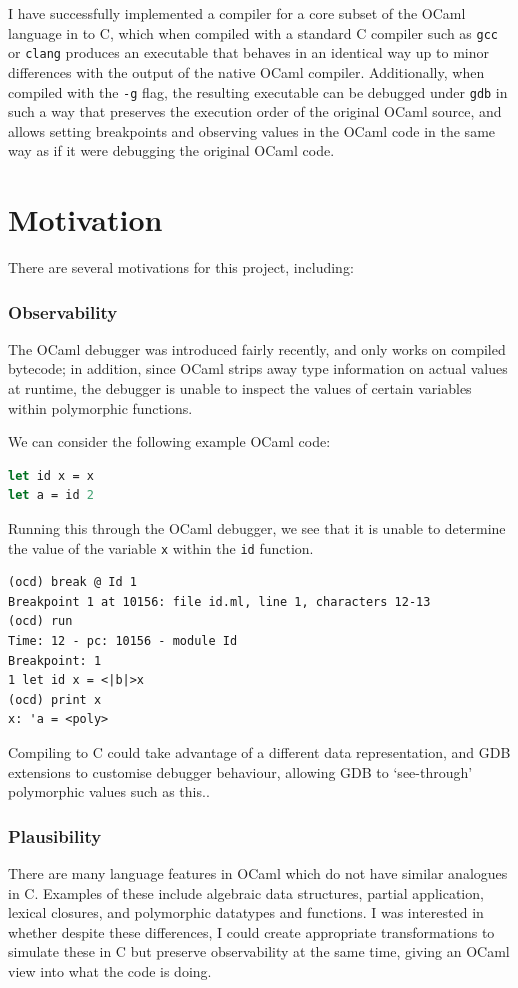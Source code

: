 \documentclass[12pt,a4paper,twoside,openright]{report}
\begin{document}
I have successfully implemented a compiler for a core subset of the OCaml
language in to C, which when compiled with a standard C compiler such as
\texttt{gcc} or \texttt{clang} produces an executable that behaves in an
identical way up to minor differences with the output of the native OCaml
compiler. Additionally, when compiled with the \texttt{-g} flag, the resulting
executable can be debugged under \texttt{gdb} in such a way that preserves the
execution order of the original OCaml source, and allows setting breakpoints and
observing values in the OCaml code in the same way as if it were debugging the
original OCaml code.

\section{Motivation}

There are several motivations for this project, including:

\subsubsection{Observability}

The OCaml debugger was introduced fairly recently, and only works on compiled 
bytecode; in addition, since OCaml strips away type information on actual 
values at runtime, the debugger is unable to inspect the values of certain 
variables within polymorphic functions.

We can consider the following example OCaml code:

\begin{lstlisting}[language=Caml]
let id x = x
let a = id 2
\end{lstlisting}

Running this through the OCaml debugger, we see that it is unable to determine
the value of the variable \texttt{x} within the \texttt{id} function.

\begin{lstlisting}
(ocd) break @ Id 1
Breakpoint 1 at 10156: file id.ml, line 1, characters 12-13
(ocd) run
Time: 12 - pc: 10156 - module Id
Breakpoint: 1
1 let id x = <|b|>x
(ocd) print x
x: 'a = <poly>
\end{lstlisting}

Compiling to C could take advantage of a different data representation, and GDB
extensions to customise debugger behaviour, allowing GDB to `see-through'
polymorphic values such as this..

\subsubsection{Plausibility} There are many language features in OCaml which do
not have similar analogues in C. Examples of these include algebraic data
structures, partial application, lexical closures, and polymorphic datatypes and
functions. I was interested in whether despite these differences, I could create
appropriate transformations to simulate these in C but preserve observability at
the same time, giving an OCaml view into what the code is doing.
\end{document}
